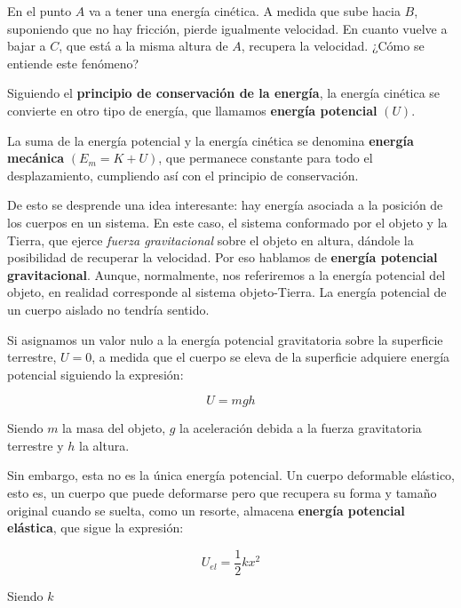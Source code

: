 En el punto \(A\) va a tener una energía cinética.
A medida que sube hacia \(B\), suponiendo que no hay fricción,
pierde igualmente velocidad.
En cuanto vuelve a bajar a \(C\), que está a la misma altura de \(A\),
recupera la velocidad. ¿Cómo se entiende este fenómeno?

Siguiendo el \textbf{principio de conservación de la energía}, 
la energía cinética se convierte en otro tipo de energía,
que llamamos \textbf{energía potencial} \((U)\).

La suma de la energía potencial y la energía cinética se denomina 
\textbf{energía mecánica} \((E_m = K + U)\),
que permanece constante para todo el desplazamiento,
cumpliendo así con el principio de conservación.

De esto se desprende una idea interesante:
hay energía asociada a la posición de los cuerpos en un sistema.
En este caso, el sistema conformado por el objeto y la Tierra,
que ejerce \textit{fuerza gravitacional} sobre el objeto en altura,
dándole la posibilidad de recuperar la velocidad.
Por eso hablamos de \textbf{energía potencial gravitacional}.
Aunque, normalmente, nos referiremos a la energía potencial del objeto,
en realidad corresponde al sistema objeto-Tierra. 
La energía potencial de un cuerpo aislado no tendría sentido.

Si asignamos un valor nulo a la energía potencial gravitatoria sobre la 
superficie terrestre, \(U = 0\), a medida que el cuerpo se eleva de la 
superficie adquiere energía potencial siguiendo la expresión:

\begin{equation*}
    U = mgh
\end{equation*}

Siendo \(m\) la masa del objeto, \(g\) la aceleración debida a la fuerza 
gravitatoria terrestre y \(h\) la altura.

Sin embargo, esta no es la única energía potencial.
Un cuerpo deformable elástico,
esto es, un cuerpo que puede deformarse pero que recupera su forma y tamaño 
original cuando se suelta,
como un resorte,
almacena \textbf{energía potencial elástica},
que sigue la expresión:

\begin{equation*}
    U_{el} = \frac{1}{2}kx^{2}
\end{equation*}

Siendo \(k\) 